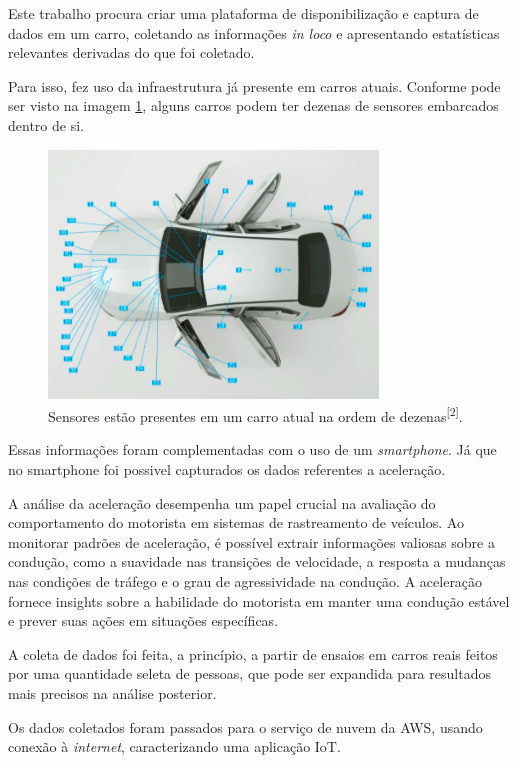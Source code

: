 Este trabalho procura criar uma plataforma de disponibilização e captura de dados em um carro, coletando as informações \textit{in loco} e apresentando estatísticas relevantes derivadas do que foi coletado.

Para isso, fez uso da infraestrutura já presente em carros atuais. Conforme pode ser visto na imagem \ref{fig:sensors_car}, alguns carros podem ter dezenas de sensores embarcados dentro de si.


\begin{figure}[hp]
    \centering
    
    \includegraphics[]{figures/sensores_carro.png}
    
    \caption{Sensores estão presentes em um carro atual na ordem de dezenas\textsuperscript{[2]}.}
    
    \label{fig:sensors_car}
\end{figure}

Essas informações foram complementadas com o uso de um \textit{smartphone}. Já que no smartphone foi possivel capturados os dados referentes a aceleração.

A análise da aceleração desempenha um papel crucial na avaliação do comportamento do motorista em sistemas de rastreamento de veículos. Ao monitorar padrões de aceleração, é possível extrair informações valiosas sobre a condução, como a suavidade nas transições de velocidade, a resposta a mudanças nas condições de tráfego e o grau de agressividade na condução. A aceleração fornece insights sobre a habilidade do motorista em manter uma condução estável e prever suas ações em situações específicas. 

A coleta de dados foi feita, a princípio, a partir de ensaios em carros reais feitos por uma quantidade seleta de pessoas, que pode ser expandida para resultados mais precisos na análise posterior.

Os dados coletados foram passados para o serviço de nuvem da AWS, usando conexão à \textit{internet}, caracterizando uma aplicação IoT.
	
